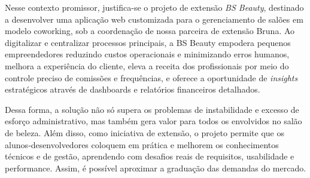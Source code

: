 \FloatBarrier

Nesse contexto promissor, justifica-se o projeto de extensão \emph{BS Beauty}, destinado a desenvolver uma aplicação web customizada para o gerenciamento de salões em modelo coworking, sob a coordenação de nossa parceira de extensão Bruna. Ao digitalizar e centralizar processos principais, a BS Beauty empodera pequenos empreendedores reduzindo custos operacionais e minimizando erros humanos, melhora a experiência do cliente, eleva a receita dos profissionais por meio do controle preciso de comissões e frequências, e oferece a oportunidade de \emph{insights} estratégicos através de dashboards e relatórios financeiros detalhados. 

Dessa forma, a solução não só supera os problemas de instabilidade e excesso de esforço administrativo, mas também gera valor para todos os envolvidos no salão de beleza. Além disso, como iniciativa de extensão, o projeto permite que os alunos‐desenvolvedores coloquem em prática e melhorem os conhecimentos técnicos e de gestão,  aprendendo com desafios reais de requisitos, usabilidade e performance. Assim, é possível aproximar a graduação das demandas do mercado.


